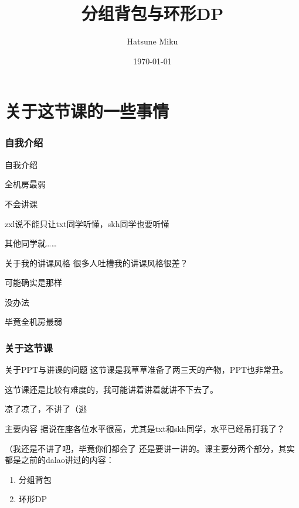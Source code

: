 \documentclass[UTF-8,aspectratio=1610]{ctexbeamer}
\title{分组背包与环形DP}
\author{Hatsune Miku}
\institute{GRYZ}
\date{\today}
\begin{document}
\begin{frame}
\maketitle
\end{frame}
\section{关于这节课的一些事情}
\begin{frame}
\frametitle{自我介绍}
\begin{block}{自我介绍}
\pause

全机房最弱\pause

不会讲课\pause

zxl说不能只让txt同学听懂，skh同学也要听懂\pause

其他同学就……
\end{block}
\pause
\begin{block}{关于我的讲课风格}
\pause
很多人吐槽我的讲课风格很差？\pause

可能确实是那样\pause

没办法\pause

毕竟全机房最弱
\end{block}
\end{frame}
\begin{frame}
\frametitle{关于这节课}
\begin{block}{关于PPT与讲课的问题}
\pause
这节课是我草草准备了两三天的产物，PPT也非常丑。\pause

这节课还是比较有难度的，我可能讲着讲着就讲不下去了。\pause

凉了凉了，不讲了（逃
\end{block}
\pause
\begin{block}{主要内容}
\pause
据说在座各位水平很高，尤其是txt和skh同学，水平已经吊打我了？\pause

（我还是不讲了吧，毕竟你们都会了\pause
还是要讲一讲的。课主要分两个部分，其实都是之前的dalao讲过的内容：\pause
\begin{enumerate}
\item{分组背包}
\item{环形DP}
\end{enumerate}
\end{block}
\end{frame}
\end{document}
